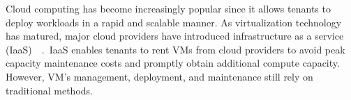 












Cloud computing has become increasingly popular since it allows tenants to deploy workloads in a rapid and scalable manner. As virtualization technology has matured, major cloud providers have introduced infrastructure as a 
service (IaaS)~\cite*{8031522}~\cite*{10.1145/2767181}.~\acrshort{IaaS} enables tenants to rent VMs from cloud providers to avoid peak capacity maintenance costs and promptly obtain additional compute capacity. However, VM's management, deployment, 
and maintenance still rely on traditional methods.
 
